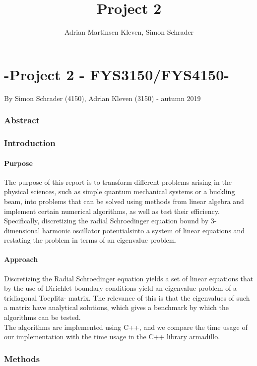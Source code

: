 \documentclass[10pt,a4paper]{article}
\author{Adrian Martinsen Kleven, Simon Schrader}
\title{Project 2}
\begin{document}
\part*{-Project 2 - FYS3150/FYS4150-
}
{\large By Simon Schrader (4150), Adrian Kleven (3150) - autumn 2019
}
\tableofcontents

\listoffigures
\listoftables

 
\clearpage
 
\section{Abstract}

\section{Introduction}
\subsection{Purpose} 
The purpose of this report is to transform different problems arising in the physical sciences, such as simple quantum mechanical systems or a buckling beam, into problems that can be solved using methods from linear algebra and implement certain numerical algorithms, as well as test their efficiency.
Specifically, discretizing the radial Schroedinger equation bound by 3- dimensional harmonic oscillator potentialsinto a system of linear equations and restating the problem in terms of an eigenvalue problem.
\subsection{Approach}
Discretizing the Radial Schroedinger equation yields a set of linear equations that by the use of Dirichlet boundary conditions yield an eigenvalue problem of a tridiagonal Toeplitz- matrix. The relevance of this is that the eigenvalues of such a matrix have analytical solutions, which gives a benchmark by which the algorithms can be tested.\\The algorithms are implemented using C++, and we compare the time usage of our implementation with the time usage in the C++ library armadillo.
\section{Methods}
\end{document}
